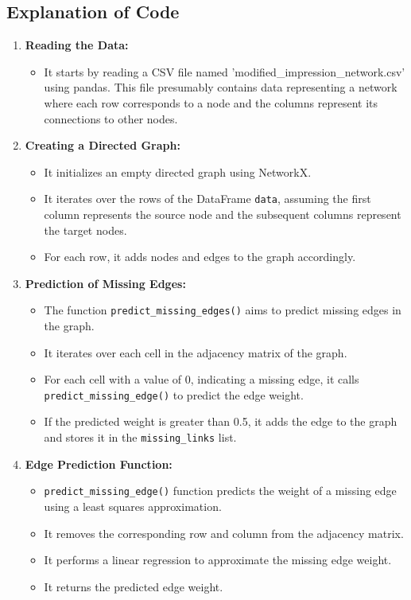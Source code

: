 \documentclass{article}
\begin{document}
\subsection{Explanation of Code}
\begin{enumerate}
    \item \textbf{Reading the Data:}
    \begin{itemize}
        \item It starts by reading a CSV file named 'modified\_impression\_network.csv' using pandas. This file presumably contains data representing a network where each row corresponds to a node and the columns represent its connections to other nodes.
    \end{itemize}
    
    \item \textbf{Creating a Directed Graph:}
    \begin{itemize}
        \item It initializes an empty directed graph using NetworkX.
        \item It iterates over the rows of the DataFrame \texttt{data}, assuming the first column represents the source node and the subsequent columns represent the target nodes.
        \item For each row, it adds nodes and edges to the graph accordingly.
    \end{itemize}
    
    \item \textbf{Prediction of Missing Edges:}
    \begin{itemize}
        \item The function \texttt{predict\_missing\_edges()} aims to predict missing edges in the graph.
        \item It iterates over each cell in the adjacency matrix of the graph.
        \item For each cell with a value of 0, indicating a missing edge, it calls \texttt{predict\_missing\_edge()} to predict the edge weight.
        \item If the predicted weight is greater than 0.5, it adds the edge to the graph and stores it in the \texttt{missing\_links} list.
    \end{itemize}
    
    \item \textbf{Edge Prediction Function:}
    \begin{itemize}
        \item \texttt{predict\_missing\_edge()} function predicts the weight of a missing edge using a least squares approximation.
        \item It removes the corresponding row and column from the adjacency matrix.
        \item It performs a linear regression to approximate the missing edge weight.
        \item It returns the predicted edge weight.
    \end{itemize}
    

\end{enumerate}
\end{document}
